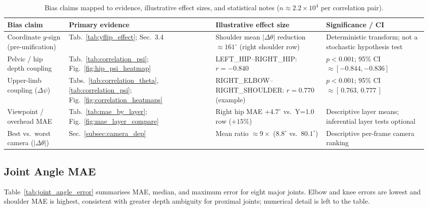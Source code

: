 \documentclass[english,fleqn]{ieej-e}
\begin{document}
\begin{table}[!t]
\centering
\caption{Bias claims mapped to evidence, illustrative effect sizes, and
  statistical notes ($n\approx 2.2\times 10^{4}$ per correlation pair).}
\label{tab:bias_claim_evidence}
\footnotesize
\begin{tabular}{>{\raggedright\arraybackslash}p{} >{\raggedright\arraybackslash}p{} >{\raggedright\arraybackslash}p{} >{\raggedright\arraybackslash}p{}}
\toprule
Bias claim & Primary evidence & Illustrative effect size & Significance / CI \\
\midrule
Coordinate $y$-sign (pre-unification) &
Tab.~\ref{tab:yflip_effect}; Sec.~3.4 &
Shoulder mean $|\Delta\theta|$ reduction
$\approx\!161^{\circ}$ (right shoulder row) &
Deterministic transform; not a stochastic hypothesis test \\
Pelvic / hip depth coupling &
Tab.~\ref{tab:correlation_psi}; Fig.~\ref{fig:hip_psi_heatmap} &
LEFT\_HIP--RIGHT\_HIP: $r=-0.840$ &
$p<0.001$; 95\% CI $\approx[-0.844,-0.836]$ \\
Upper-limb coupling ($\Delta\psi$) &
Tabs.~\ref{tab:correlation_theta}, \ref{tab:correlation_psi};
Fig.~\ref{fig:correlation_heatmaps} &
RIGHT\_ELBOW--RIGHT\_SHOULDER: $r=0.770$ (example) &
$p<0.001$; 95\% CI $\approx[\,0.763,\,0.777\,]$ \\
Viewpoint / overhead MAE &
Tab.~\ref{tab:mae_by_layer}; Fig.~\ref{fig:mae_layer_compare} &
Right hip MAE $+4.7^{\circ}$ vs.\ Y=1.0 row ($+15\%$) &
Descriptive layer means; inferential layer tests optional \\
Best vs.\ worst camera ($|\Delta\theta|$) &
Sec.~\ref{subsec:camera_dep} &
Mean ratio $\approx 9\times$ ($8.8^{\circ}$ vs.\ $80.1^{\circ}$) &
Descriptive per-frame camera ranking \\
\bottomrule
\end{tabular}
\end{table}

\subsection{Joint Angle MAE}

Table~\ref{tab:joint_angle_error} summarises MAE, median, and maximum
error for eight major joints. Elbow and knee errors are lowest and shoulder
MAE is highest, consistent with greater depth ambiguity for proximal joints;
numerical detail is left to the table.
\end{document}
